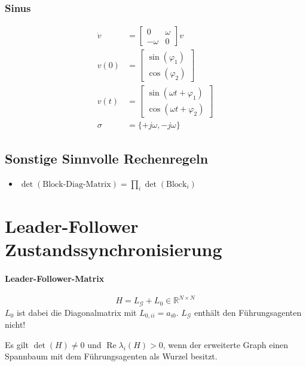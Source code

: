 \subsubsection{Sinus}
\begin{align}
    \dot{v} &= \begin{bmatrix}
        0 & \omega \\
        -\omega & 0
    \end{bmatrix} v \\
    v(0) &= \begin{bmatrix}
        \sin(\varphi_1) \\
        \cos(\varphi_2)
    \end{bmatrix} \\
    v(t) &= \begin{bmatrix}
        \sin(\omega t + \varphi_1) \\
        \cos(\omega t + \varphi_2)
    \end{bmatrix} \\
    \sigma &= \{+j\omega, -j\omega\}
\end{align}

\subsection{Sonstige Sinnvolle Rechenregeln}
\begin{itemize}
    \item $\det(\text{Block-Diag-Matrix}) = \prod_i \det(\text{Block}_i)$
\end{itemize}

\section{Leader-Follower Zustandssynchronisierung}
\paragraph{Leader-Follower-Matrix}
\label{par:leader_follower_matrix}
\begin{equation}
    \tag{Leader-Follower-Matrix}
    H = L_\mathcal{G} + L_0 \in \mathbb{R}^{N\times N}
    \label{eqn:lf_matrix}
\end{equation}
$L_0$ ist dabei die Diagonalmatrix mit $L_{0,ii}=a_{i0}$.
$L_\mathcal{G}$ enthält den Führungsagenten nicht!

Es gilt $\det(H) \neq 0$ und $\operatorname{Re}\lambda_i(H) > 0$,
wenn der erweiterte Graph einen Spannbaum mit dem Führungsagenten als
Wurzel besitzt.

